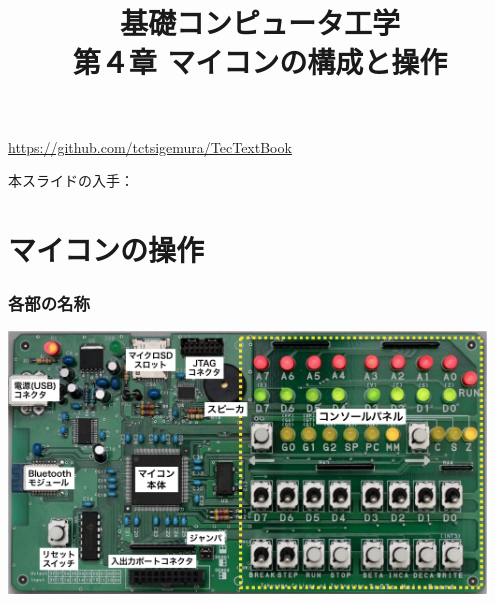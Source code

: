 \documentclass[handout]{beamer}         %
\begin{document}
\title{基礎コンピュータ工学\\第４章 マイコンの構成と操作}
\date{}

\begin{frame}
  \titlepage
  \centerline{\url{https://github.com/tctsigemura/TecTextBook}}
  \vfill
  \centerline{本スライドの入手：
    }
\end{frame}


\section{マイコンの操作}
\begin{frame}
  \frametitle{各部の名称}
  \vfill
  \centerline{
    \includegraphics[width=0.95\textwidth]{../Keynote/kakubu-crop.pdf}}
  \vfill
\end{frame}
\end{document}
